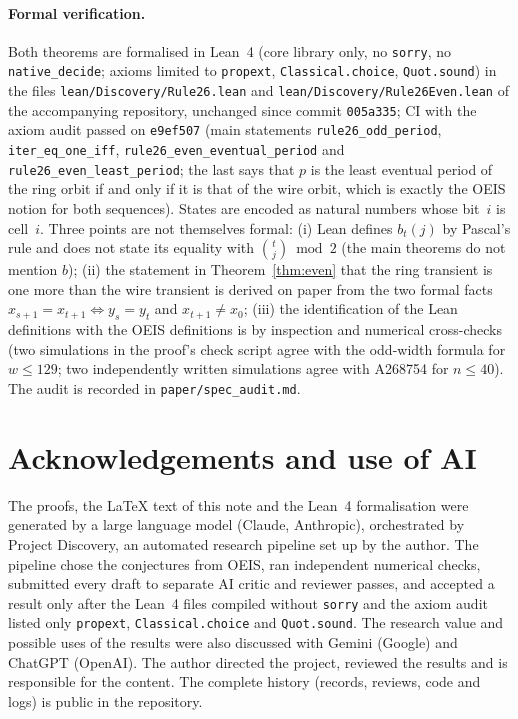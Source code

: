 \documentclass[11pt]{article}
\theoremstyle{definition}
\theoremstyle{remark}
\begin{document}
\paragraph{Formal verification.}
Both theorems are formalised in Lean~4 (core library only, no
\texttt{sorry}, no \texttt{native\_decide}; axioms limited to
\texttt{propext}, \texttt{Classical.choice}, \texttt{Quot.sound}) in the
files \texttt{lean/Discovery/Rule26.lean} and
\texttt{lean/Discovery/Rule26Even.lean} of the accompanying repository,
unchanged since commit \texttt{005a335}; CI with the axiom audit passed on
\texttt{e9ef507} (main statements \texttt{rule26\_odd\_period}, \texttt{iter\_eq\_one\_iff},
\texttt{rule26\_even\_eventual\_period} and
\texttt{rule26\_even\_least\_period}; the last says that $p$ is the least
eventual period of the ring orbit if and only if it is that of the wire orbit,
which is exactly the OEIS notion for both sequences).
States are encoded as natural numbers whose bit~$i$ is cell~$i$. Three points
are not themselves formal: (i) Lean defines $b_t(j)$ by
Pascal's rule and does not state its equality with $\binom{t}{j} \bmod 2$
(the main theorems do not mention $b$); (ii) the statement in
Theorem~\ref{thm:even} that the ring transient is one more than the wire
transient is derived on paper from the two formal facts
$x_{s+1} = x_{t+1} \iff y_s = y_t$ and $x_{t+1} \ne x_0$; (iii) the identification of the Lean
definitions with the OEIS definitions is by inspection and numerical
cross-checks (two simulations in the proof's check script agree with the
odd-width formula for $w \le 129$; two independently written simulations agree
with A268754 for $n \le 40$). The audit is recorded in
\texttt{paper/spec\_audit.md}.

\section*{Acknowledgements and use of AI}
The proofs, the \LaTeX{} text of this note and the Lean~4 formalisation were
generated by a large language model (Claude, Anthropic), orchestrated by
Project Discovery, an automated research pipeline set up by the author. The
pipeline chose the conjectures from OEIS, ran independent numerical checks,
submitted every draft to separate AI critic and reviewer passes, and accepted
a result only after the Lean~4 files compiled without \texttt{sorry} and the
axiom audit listed only \texttt{propext}, \texttt{Classical.choice} and
\texttt{Quot.sound}. The research value and possible uses of the results were
also discussed with Gemini (Google) and ChatGPT (OpenAI). The author directed
the project, reviewed the results and is responsible for the content. The
complete history (records, reviews, code and logs) is public in the
repository.
\end{document}
